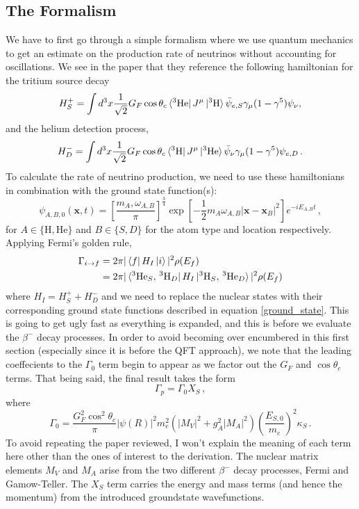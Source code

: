 \documentclass[10pt]{article}
\begin{document}
\subsection{The Formalism}
We have to first go through a simple formalism where we use quantum mechanics to get an estimate on the production rate of neutrinos without accounting for oscillations. We see in the paper that they reference the following hamiltonian for the tritium source decay
\begin{equation}
  H_{S}^{+} = \int d^{3}x\frac{1}{\sqrt{2}}G_{F}\cos\theta_{c}\bra{^{3}\textnormal{He}}J^{\mu}\ket{^{3}\textnormal{H}}\bar{\psi}_{e,S}\gamma_{\mu}(1-\gamma^{5})\psi_{\nu},
\end{equation}
and the helium detection process,
\begin{equation}
  H_{D}^{-} = \int d^{3}x\frac{1}{\sqrt{2}}G_{F}\cos\theta_{c}\bra{^{3}\textnormal{H}}J^{\mu}\ket{^{3}\textnormal{He}}\bar{\psi}_{\nu}\gamma_{\mu}(1-\gamma^{5})\psi_{e,D}\, .
\end{equation}
To calculate the rate of neutrino production, we need to use these hamiltonians in combination with the ground state function(s):
\begin{equation}\label{ground_state}
  \psi_{A,B,0}(\bm{x}, t) = \left[\frac{m_{A},\omega_{A,B}}{\pi}\right]^{\frac{3}{4}}\exp\left[-\frac{1}{2}m_{A}\omega_{A,B}|\bm{x} - \bm{x}_{B}|^{2}\right]e^{-iE_{A,B}t}\, ,
\end{equation}
for $A \in \{\text{H}, \text{He}\}$ and $B\in \{S, D\}$ for the atom type and location respectively. Applying Fermi's golden rule,
\begin{align*}
  \Gamma_{i \to f} & = 2\pi|\bra{f}H_{I}\ket{i}|^{2}\rho(E_{f}) \\
  & = 2\pi|\bra{^{3}\text{He}_{S},\, ^{3}\text{H}_{D}}H_{I}\ket{^{3}\text{H}_{S},\, ^{3}\text{He}_{D}}|^{2}\rho(E_{f})
\end{align*}
where $H_{I} = H^{+}_{S} + H^{-}_{D}$ and we need to replace the nuclear states with their corresponding ground state functions described in equation \ref{ground_state}. This is going to get ugly fast as everything is expanded, and this is before we evaluate the $\beta^{-}$ decay processes. In order to avoid becoming over encumbered in this first section (especially since it is before the QFT approach), we note that the leading coeffecients to the $\Gamma_{0}$ term begin to appear as we factor out the $G_{F}$ and $\cos\theta_{c}$ terms. That being said, the final result takes the form
\begin{equation}
  \Gamma_{p} = \Gamma_{0}X_{S}\, ,
\end{equation}
where
\begin{equation}
  \Gamma_{0} = \frac{G^{2}_{F}\cos^{2}\theta_{c}}{\pi}|\psi(R)|^{2}m_{e}^{2}(|M_{V}|^{2}+g^{2}_{A}|M_{A}|^{2})\left(\frac{E_{S,0}}{m_{e}}\right)^{2}\kappa_{S}\, .
\end{equation}
To avoid repeating the paper reviewed, I won't explain the meaning of each term here other than the ones of interest to the derivation. The nuclear matrix elements $M_{V}$ and $M_{A}$ arise from the two different $\beta^{-}$ decay processes, Fermi and Gamow-Teller. The $X_{S}$ term carries the energy and mass terms (and hence the momentum) from the introduced groundstate wavefunctions. 
\end{document}

